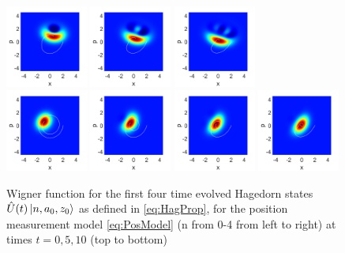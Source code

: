 \documentclass[12pt]{iopart} %
\begin{document}
\begin{figure}
\begin{centering}
	  \includegraphics[width=0.24\textwidth]{State1t5Pos.pdf}
	  \includegraphics[width=0.24\textwidth]{State2t5Pos.pdf} 
	  \includegraphics[width=0.24\textwidth]{State3t5Pos.pdf}\\
	  \includegraphics[width=0.24\textwidth]{State0t10Pos.pdf}
	  \includegraphics[width=0.24\textwidth]{State1t10Pos.pdf}
	  \includegraphics[width=0.24\textwidth]{State2t10Pos.pdf}
	  \includegraphics[width=0.24\textwidth]{State3t10Pos.pdf} \\
\caption{Wigner function for the first four time evolved Hagedorn states $\hat{U}(t)\ket{n,a_0,z_0}$ as defined in \cref{eq:HagProp}, for the position measurement model \cref{eq:PosModel} (n from 0-4 from left to right) at times $t=0,5,10$ (top to bottom)}\label{fig:HagBasisProp}
\end{centering}
\end{figure}
\end{document}
